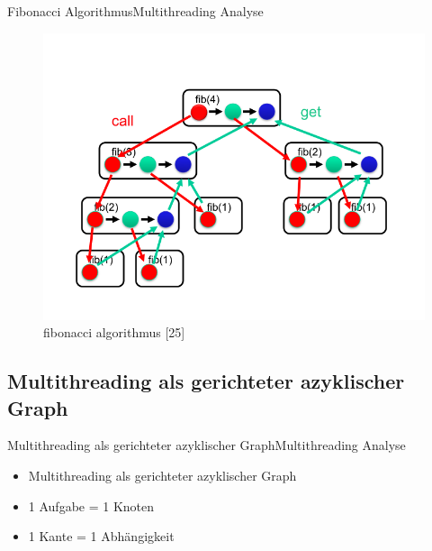 \documentclass{beamer}
\begin{document}
\begin{frame}{Fibonacci Algorithmus}{Multithreading Analyse}

\begin{figure}
\centering
\includegraphics[width=0.7\columnwidth]{./assets/Slide043.png}
\caption{fibonacci algorithmus \cite{Herlihy1}[25]}
\label{fig:my_label}
\end{figure}

\end{frame}

\subsection{Multithreading als gerichteter azyklischer Graph}
\begin{frame}{Multithreading als gerichteter azyklischer Graph}{Multithreading Analyse}
\begin{itemize}
\item Multithreading als gerichteter azyklischer Graph
\item 1 Aufgabe = 1 Knoten
\item 1 Kante = 1 Abh\"angigkeit
\end{itemize}
\end{frame}
\end{document}
